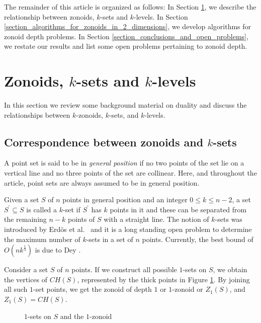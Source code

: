 \documentclass[charterfonts,lotsofwhite]{patmorin}
\begin{document}
The remainder of this article is organized as follows: In Section
\ref{section_zonoids_ksets_and_klevels}, we describe the relationship
between zonoids, $k$-sets and $k$-levels.  In Section
\ref{section_algorithms_for_zonoids_in_2_dimensions}, we develop
algorithms for zonoid depth problems.  In Section
\ref{section_conclusions_and_open_problems}, we restate our results
and list some open problems pertaining to zonoid depth.


\section{Zonoids, $k$-sets and $k$-levels}
\label{section_zonoids_ksets_and_klevels}

In this section we review some background material on duality and
discuss the relationships between $k$-zonoids, $k$-sets, and
$k$-levels.

\subsection{Correspondence between zonoids and $k$-sets}\label{subsection_correspondence_between_zonoids_and_ksets}

A point set is said to be in \emph{general position} if no two points
of the set lie on a vertical line and no three points of the set are
collinear. Here, and throughout the article, point sets are always
assumed to be in general position.

Given a set $S$ of $n$ points in general position and an integer $0
\le k \le n-2$, a set $S^{\prime} \subseteq S$ is called a $k$-set if
$S^{\prime}$ has $k$ points in it and these can be separated from the
remaining $n-k$ points of $S$ with a straight line. The notion of
$k$-sets was introduced by Erd\"{o}s et al.\
\cite{dissection_graphs_of_planar_point_sets} and it is a long
standing open problem to determine the maximum number of $k$-sets in a
set of $n$ points. Currently, the best bound of $O(nk^{\frac{1}{3}})$
is due to Dey \cite{improved_bounds_on_planar_ksets_and_klevels}.

Consider a set $S$ of $n$ points. If we construct all possible
$1$-sets on $S$, we obtain the vertices of $CH(S)$, represented by the
thick points in Figure \ref{fig_1_set}. By joining all such $1$-set
points, we get the zonoid of depth $1$ or $1$-zonoid or $Z_1(S)$, and
$Z_1(S) = CH(S)$.

\begin{figure}[h!]
 \begin{center}
   \caption{\label{fig_1_set}$1$-sets on $S$ and the $1$-zonoid}
 \end{center}
\end{figure}
\end{document}
